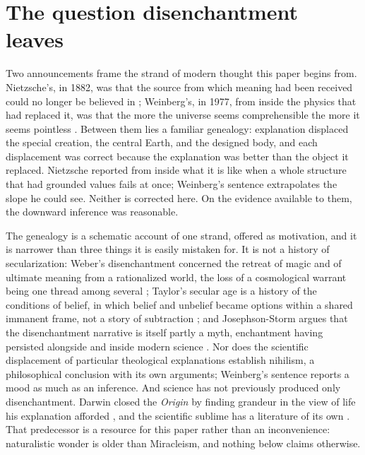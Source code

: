 \section{The question disenchantment leaves}\label{sec:valley}

Two announcements frame the strand of modern thought this paper begins from.
Nietzsche's, in 1882, was that the source from which meaning had been received
could no longer be believed in \cite{nietzsche1974gay}; Weinberg's, in 1977,
from inside the physics that had replaced it, was that the more the universe
seems comprehensible the more it seems pointless \cite{Weinberg77}. Between
them lies a familiar genealogy: explanation displaced the special creation,
the central Earth, and the designed body, and each displacement was correct
because the explanation was better than the object it replaced. Nietzsche
reported from inside what it is like when a whole structure that had grounded
values fails at once; Weinberg's sentence extrapolates the slope he could see.
Neither is corrected here. On the evidence available to them, the downward
inference was reasonable.

The genealogy is a schematic account of one strand, offered as motivation, and
it is narrower than three things it is easily mistaken for. It is not a
history of secularization: Weber's disenchantment concerned the retreat of
magic and of ultimate meaning from a rationalized world, the loss of a
cosmological warrant being one thread among several \cite{Weber1919};
Taylor's secular age is a history of the conditions of belief, in which belief
and unbelief became options within a shared immanent frame, not a story of
subtraction \cite{Taylor07}; and Josephson-Storm argues that the
disenchantment narrative is itself partly a myth, enchantment having persisted
alongside and inside modern science \cite{JosephsonStorm17}. Nor does the scientific
displacement of particular theological explanations establish nihilism, a
philosophical conclusion with its own arguments; Weinberg's sentence reports a
mood as much as an inference. And science has
not previously produced only disenchantment. Darwin closed the \emph{Origin}
by finding grandeur in the view of life his explanation afforded
\cite{Darwin1859}, and the scientific sublime has a literature of its own
\cite{Gross18}. That predecessor is a resource for this paper rather than an
inconvenience: naturalistic wonder is older than Miracleism, and nothing below
claims otherwise.

